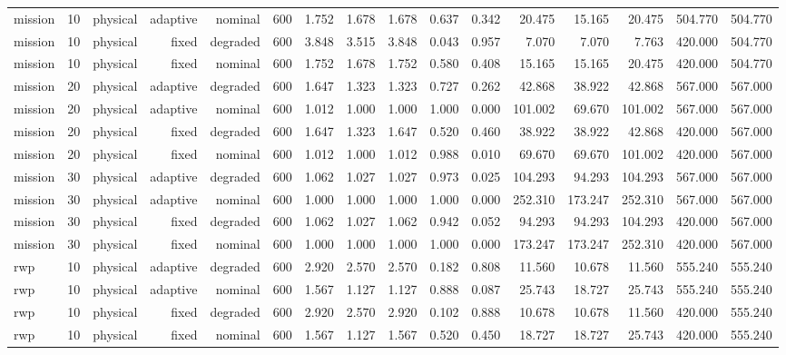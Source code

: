\begin{tabular}{lrrrrrrrrrrrrrrr}
mission & 10 & physical & adaptive & nominal & 600 & 1.752 & 1.678 & 1.678 & 0.637 & 0.342 & 20.475 & 15.165 & 20.475 & 504.770 & 504.770 \\
mission & 10 & physical & fixed & degraded & 600 & 3.848 & 3.515 & 3.848 & 0.043 & 0.957 & 7.070 & 7.070 & 7.763 & 420.000 & 504.770 \\
mission & 10 & physical & fixed & nominal & 600 & 1.752 & 1.678 & 1.752 & 0.580 & 0.408 & 15.165 & 15.165 & 20.475 & 420.000 & 504.770 \\
mission & 20 & physical & adaptive & degraded & 600 & 1.647 & 1.323 & 1.323 & 0.727 & 0.262 & 42.868 & 38.922 & 42.868 & 567.000 & 567.000 \\
mission & 20 & physical & adaptive & nominal & 600 & 1.012 & 1.000 & 1.000 & 1.000 & 0.000 & 101.002 & 69.670 & 101.002 & 567.000 & 567.000 \\
mission & 20 & physical & fixed & degraded & 600 & 1.647 & 1.323 & 1.647 & 0.520 & 0.460 & 38.922 & 38.922 & 42.868 & 420.000 & 567.000 \\
mission & 20 & physical & fixed & nominal & 600 & 1.012 & 1.000 & 1.012 & 0.988 & 0.010 & 69.670 & 69.670 & 101.002 & 420.000 & 567.000 \\
mission & 30 & physical & adaptive & degraded & 600 & 1.062 & 1.027 & 1.027 & 0.973 & 0.025 & 104.293 & 94.293 & 104.293 & 567.000 & 567.000 \\
mission & 30 & physical & adaptive & nominal & 600 & 1.000 & 1.000 & 1.000 & 1.000 & 0.000 & 252.310 & 173.247 & 252.310 & 567.000 & 567.000 \\
mission & 30 & physical & fixed & degraded & 600 & 1.062 & 1.027 & 1.062 & 0.942 & 0.052 & 94.293 & 94.293 & 104.293 & 420.000 & 567.000 \\
mission & 30 & physical & fixed & nominal & 600 & 1.000 & 1.000 & 1.000 & 1.000 & 0.000 & 173.247 & 173.247 & 252.310 & 420.000 & 567.000 \\
rwp & 10 & physical & adaptive & degraded & 600 & 2.920 & 2.570 & 2.570 & 0.182 & 0.808 & 11.560 & 10.678 & 11.560 & 555.240 & 555.240 \\
rwp & 10 & physical & adaptive & nominal & 600 & 1.567 & 1.127 & 1.127 & 0.888 & 0.087 & 25.743 & 18.727 & 25.743 & 555.240 & 555.240 \\
rwp & 10 & physical & fixed & degraded & 600 & 2.920 & 2.570 & 2.920 & 0.102 & 0.888 & 10.678 & 10.678 & 11.560 & 420.000 & 555.240 \\
rwp & 10 & physical & fixed & nominal & 600 & 1.567 & 1.127 & 1.567 & 0.520 & 0.450 & 18.727 & 18.727 & 25.743 & 420.000 & 555.240 \\

\end{tabular}

